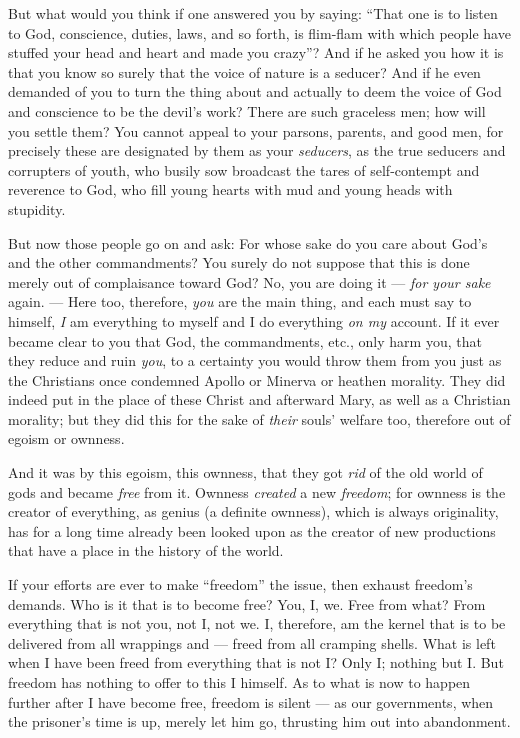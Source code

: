 But what would you think if one answered you by saying: ``That one is to 
listen to God, conscience, duties, laws, and so forth, is flim-flam with which 
people have stuffed your head and heart and made you crazy''? And if he asked 
you how it is that you know so surely that the voice of nature is a seducer? 
And if he even demanded of you to turn the thing about and actually to deem 
the voice of God and conscience to be the devil's work? There are such 
graceless men; how will you settle them? You cannot appeal to your parsons, 
parents, and good men, for precisely these are designated by them as your 
\textit{seducers}, as the true seducers and corrupters of youth, who busily 
sow broadcast the tares of self-contempt and reverence to God, who fill young 
hearts with mud and young heads with stupidity.

But now those people go on and ask: For whose sake do you care about God's and 
the other commandments? You surely do not suppose that this is done merely out 
of complaisance toward God? No, you are doing it --- \textit{for your sake} 
again. --- Here too, therefore, \textit{you} are the main thing, and each must 
say to himself, \textit{I} am everything to myself and I do everything 
\textit{on my} account. If it ever became clear to you that God, the 
commandments, etc., only harm you, that they reduce and ruin \textit{you}, to 
a certainty you would throw them from you just as the Christians once 
condemned Apollo or Minerva or heathen morality. They did indeed put in the 
place of these Christ and afterward Mary, as well as a Christian morality; but 
they did this for the sake of \textit{their} souls' welfare too, therefore out 
of egoism or ownness.

And it was by this egoism, this ownness, that they got \textit{rid} of the old 
world of gods and became \textit{free} from it. Ownness \textit{created} a new 
\textit{freedom}; for ownness is the creator of everything, as genius (a 
definite ownness), which is always originality, has for a long time already 
been looked upon as the creator of new productions that have a place in the 
history of the world.

If your efforts are ever to make ``freedom'' the issue, then exhaust 
freedom's demands. Who is it that is to become free? You, I, we. Free from 
what? From everything that is not you, not I, not we. I, therefore, am the 
kernel that is to be delivered from all wrappings and --- freed from all 
cramping shells. What is left when I have been freed from everything that is 
not I? Only I; nothing but I. But freedom has nothing to offer to this I 
himself. As to what is now to happen further after I have become free, freedom 
is silent --- as our governments, when the prisoner's time is up, merely let 
him go, thrusting him out into abandonment.

